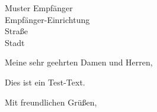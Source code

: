 \documentclass[%
	fromlogo, %
	fromalign=left, %
	fromrule=no, %
	addrfield=on, %
	fontsize=12pt, %
	numericaldate=true,
    backaddress=on,%
	locfield=narrow, %
	subject=beforeopening,
	foldmarks=on,
	version=last,
	subject=titled
	]{scrlttr2}
\newcommand{\toname}{Muster Empfänger}
\newcommand{\tocity}{Stadt}
\newcommand{\tostreet}{Straße}
\newcommand{\tocoorp}{Empfänger-Einrichtung}
\begin{document}
	\begin{letter}{\toname\\
					\tocoorp\\
					\tostreet\\
					\tocity}


		\opening{Meine sehr geehrten Damen und Herren,}

			Dies ist ein Test-Text.

		\closing{Mit freundlichen Grüßen,}
		



	\end{letter}
	
\end{document}
